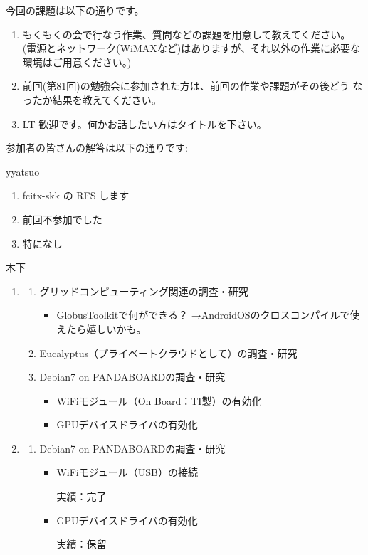 \documentclass[mingoth,a4paper]{jsarticle}
\begin{document}
今回の課題は以下の通りです。
\begin{screen}
  \begin{enumerate}
  \item %
    もくもくの会で行なう作業、質問などの課題を用意して教えてください。
    (電源とネットワーク(WiMAXなど)はありますが、それ以外の作業に必要な
    環境はご用意ください。)

  \item %
    前回(第81回)の勉強会に参加された方は、前回の作業や課題がその後どう
    なったか結果を教えてください。

  \item %
    LT 歓迎です。何かお話したい方はタイトルを下さい。
  \end{enumerate}
\end{screen}

参加者の皆さんの解答は以下の通りです:

\begin{prework}{ yyatsuo }
  \begin{enumerate}
  \item fcitx-skk の RFS します
  \item 前回不参加でした
  \item 特になし
  \end{enumerate}
\end{prework}

\begin{prework}{ 木下 }
  \begin{enumerate}
  \item
    \begin{enumerate}
    \item グリッドコンピューティング関連の調査・研究
      \begin{itemize}
      \item GlobusToolkitで何ができる？
        →AndroidOSのクロスコンパイルで使えたら嬉しいかも。
      \end{itemize}
    \item Eucalyptus（プライベートクラウドとして）の調査・研究
    \item Debian7 on PANDABOARDの調査・研究
      \begin{itemize}
      \item WiFiモジュール（On Board：TI製）の有効化
      \item GPUデバイスドライバの有効化
      \end{itemize}
    \end{enumerate}
  \item
    \begin{enumerate}
    \item Debian7 on PANDABOARDの調査・研究
      \begin{itemize}
      \item WiFiモジュール（USB）の接続

        実績：完了
      \item GPUデバイスドライバの有効化

        実績：保留
      \end{itemize}
    \end{enumerate}
  \end{enumerate}
\end{prework}
\end{document}
